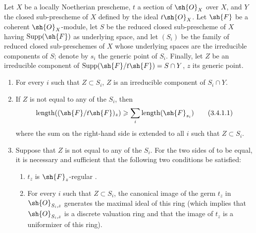 \begin{proposition}[3.4.1]
\label{IV.3.4.1}
Let $X$ be a locally Noetherian prescheme, $t$ a section of $\sh{O}_X$ over $X$, and $Y$ the closed sub-prescheme of $X$ defined by the ideal $t\sh{O}_X$.
Let $\sh{F}$ be a coherent $\sh{O}_X$-module, let $S$ be the reduced closed sub-prescheme of $X$ having $\operatorname{Supp}(\sh{F})$ as underlying space, and let $(S_i)$ be the family of reduced closed sub-preschemes of $X$ whose underlying spaces are the irreducible components of $S$; denote by $s_i$ the generic point of $S_i$.
Finally, let $Z$ be an irreducible component of $\operatorname{Supp}(\sh{F}/t\sh{F})=S\cap Y$, $z$ its generic point.
\begin{enumerate}
  \item[\emph{(i)}] For every $i$ such that $Z\subset S_i$, $Z$ is an irreducible component of $S_i\cap Y$.
  \item[\emph{(ii)}] If $Z$ is not equal to any of the $S_i$, then
\[
\label{IV.3.4.1.1}
\operatorname{length}((\sh{F}/t\sh{F})_z)\geqslant\sum_i\operatorname{length}(\sh{F}_{s_i})
\tag{3.4.1.1}
\]
where the sum on the right-hand side is extended to all $i$ such that $Z\subset S_i$.
  \item[\emph{(iii)}] Suppose that $Z$ is not equal to any of the $S_i$.
  For the two sides of  to be equal, it is necessary and sufficient that the following two conditions be satisfied:
  \begin{enumerate}
    \item[\emph{$\alpha$)}] $t_z$ is $\sh{F}_z$-regular .
    \item[\emph{$\beta$)}] For every $i$ such that $Z\subset S_i$, the canonical image of the germ $t_z$ in $\sh{O}_{S_i,z}$ generates the maximal ideal of this ring (which implies that $\sh{O}_{S_i,z}$ is a discrete valuation ring and that the image of $t_z$ is a uniformizer of this ring).
  \end{enumerate}
\end{enumerate}
\end{proposition}

